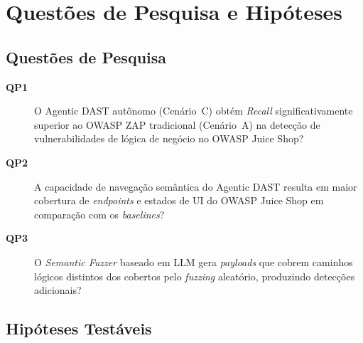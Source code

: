 \documentclass[
    12pt,
    openany,
    oneside,
    a4paper,
    brazil
]{abntex2}
\begin{document}
\chapter{Questões de Pesquisa e Hipóteses}

\section{Questões de Pesquisa}

\begin{description}
  \item[\textbf{QP1}] O Agentic DAST autônomo (Cenário~C) obtém
  \textit{Recall} significativamente superior ao OWASP ZAP tradicional
  (Cenário~A) na detecção de vulnerabilidades de lógica de negócio no
  OWASP Juice Shop?

  \item[\textbf{QP2}] A capacidade de navegação semântica do Agentic
  DAST resulta em maior cobertura de \textit{endpoints} e estados de UI
  do OWASP Juice Shop em comparação com os \textit{baselines}?

  \item[\textbf{QP3}] O \textit{Semantic Fuzzer} baseado em LLM gera
  \textit{payloads} que cobrem caminhos lógicos distintos dos cobertos
  pelo \textit{fuzzing} aleatório, produzindo detecções adicionais?
\end{description}

\section{Hipóteses Testáveis}
\end{document}
